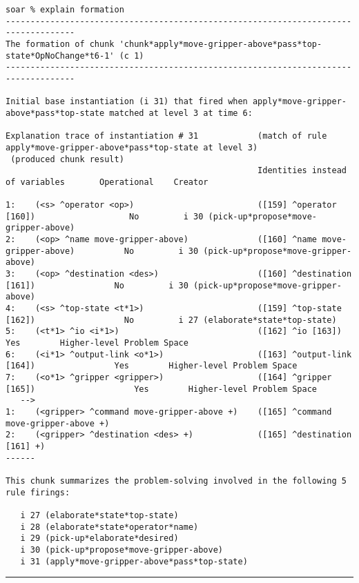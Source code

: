 {\tiny
\begin{verbatim}
soar % explain formation
------------------------------------------------------------------------------------
The formation of chunk 'chunk*apply*move-gripper-above*pass*top-state*OpNoChange*t6-1' (c 1)
------------------------------------------------------------------------------------

Initial base instantiation (i 31) that fired when apply*move-gripper-above*pass*top-state matched at level 3 at time 6:

Explanation trace of instantiation # 31            (match of rule apply*move-gripper-above*pass*top-state at level 3)
 (produced chunk result)
                                                   Identities instead of variables       Operational    Creator

1:    (<s> ^operator <op>)                         ([159] ^operator [160])                   No         i 30 (pick-up*propose*move-gripper-above)
2:    (<op> ^name move-gripper-above)              ([160] ^name move-gripper-above)          No         i 30 (pick-up*propose*move-gripper-above)
3:    (<op> ^destination <des>)                    ([160] ^destination [161])                No         i 30 (pick-up*propose*move-gripper-above)
4:    (<s> ^top-state <t*1>)                       ([159] ^top-state [162])                  No         i 27 (elaborate*state*top-state)
5:    (<t*1> ^io <i*1>)                            ([162] ^io [163])                         Yes        Higher-level Problem Space
6:    (<i*1> ^output-link <o*1>)                   ([163] ^output-link [164])                Yes        Higher-level Problem Space
7:    (<o*1> ^gripper <gripper>)                   ([164] ^gripper [165])                    Yes        Higher-level Problem Space
   -->
1:    (<gripper> ^command move-gripper-above +)    ([165] ^command move-gripper-above +)
2:    (<gripper> ^destination <des> +)             ([165] ^destination [161] +)
------

This chunk summarizes the problem-solving involved in the following 5
rule firings:

   i 27 (elaborate*state*top-state)
   i 28 (elaborate*state*operator*name)
   i 29 (pick-up*elaborate*desired)
   i 30 (pick-up*propose*move-gripper-above)
   i 31 (apply*move-gripper-above*pass*top-state)
\end{verbatim}
}

\rule{\textwidth}{1pt}

\textbf{}

